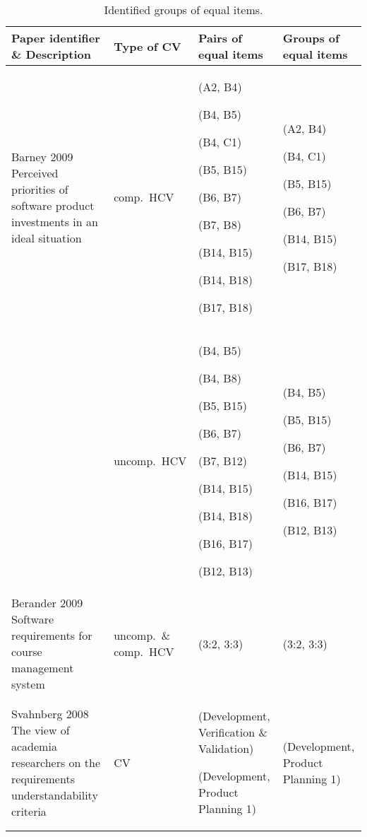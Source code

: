 \begin{table*}
\scriptsize
\caption{\label{tab:ECVresult}Identified groups of equal items.}

\begin{tabular}{|>{\centering}p{}|>{\centering}p{}|>{\centering}p{}|>{\centering}p{}|}
\hline 
Paper identifier \& Description  & Type of CV  & Pairs of equal items  & Groups of equal items\tabularnewline
\hline 
Barney 2009 \cite{Barney2009} Perceived priorities of software product investments
in an ideal situation  & comp.\ HCV & (A2, B4)

(B4, B5)

(B4, C1)

(B5, B15)

(B6, B7)

(B7, B8)

(B14, B15)

(B14, B18)

(B17, B18) & (A2, B4)

(B4, C1)

(B5, B15)

(B6, B7)

(B14, B15)

(B17, B18)\tabularnewline
\cline{2-4}
 & uncomp.\ HCV & (B4, B5)

(B4, B8)

(B5, B15)

(B6, B7)

(B7, B12)

(B14, B15)

(B14, B18)

(B16, B17)

(B12, B13) & (B4, B5)

(B5, B15)

(B6, B7)

(B14, B15)

(B16, B17)

(B12, B13)\tabularnewline
\hline 
Berander 2009 \cite{Berander2009a} Software requirements for course management system  & uncomp.\ \& comp.\ HCV  & (3:2, 3:3) & (3:2, 3:3)\tabularnewline
\hline 
Svahnberg 2008 \cite{Svahnberg2008} The view of academia researchers
on the requirements understandability criteria  & CV & (Development, Verification \& Validation)

(Development, Product Planning 1) & (Development, Product Planning 1)\tabularnewline
\hline
\end{tabular}%
\end{table*}


